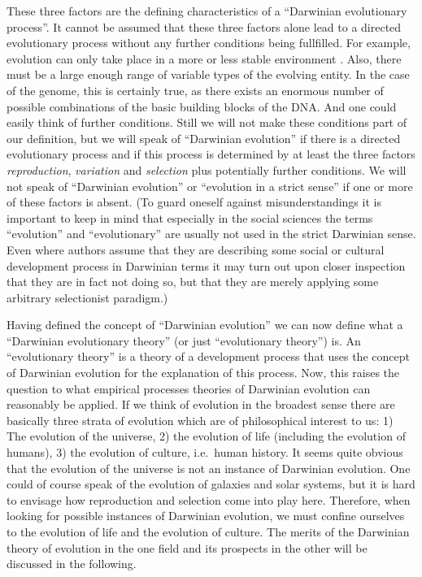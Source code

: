 These three factors are the defining characteristics of a ``Darwinian
evolutionary process''. It cannot be assumed that these three factors alone
lead to a directed evolutionary process without any further conditions being
fullfilled. For example, evolution can only take place in a more or less
stable environment \cite[p.\   336/336.]{schurz:2001}. Also, there must be a
large enough range of variable types of the evolving entity.  In the case of
the genome, this is certainly true, as there exists an enormous number of
possible combinations of the basic building blocks of the DNA. And one could
easily think of further conditions.  Still we will not make these conditions
part of our definition, but we will speak of ``Darwinian evolution'' if there
is a directed evolutionary process and if this process is determined by at
least the three factors {\em reproduction}, {\em variation} and {\em
  selection} plus potentially further conditions. We will not speak of
``Darwinian evolution'' or ``evolution in a strict sense'' if one or more of
these factors is absent. (To guard oneself against misunderstandings it is
important to keep in mind that especially in the social sciences the terms
``evolution'' and ``evolutionary'' are usually not used in the strict
Darwinian sense. Even where authors assume that they are describing some
social or cultural development process in Darwinian terms it may turn out upon
closer inspection that they are in fact not doing so, but that they are merely
applying some arbitrary selectionist paradigm.)

Having defined the concept of ``Darwinian evolution'' we can now define what a
``Darwinian evolutionary theory'' (or just ``evolutionary theory'') is.  An
``evolutionary theory'' is a theory of a development process that uses the
concept of Darwinian evolution for the explanation of this process. Now, this
raises the question to what empirical processes theories of Darwinian evolution can
reasonably be applied. If we think of evolution in the broadest sense there
are basically three strata of evolution which are of philosophical interest to
us: 1) The evolution of the universe, 2) the evolution of life (including the
evolution of humans), 3) the evolution of culture, i.e.\ human history. It
seems quite obvious that the evolution of the universe is not an instance of
Darwinian evolution. One could of course speak of the evolution of galaxies
and solar systems, but it is hard to envisage how reproduction and selection
come into play here. Therefore, when looking for possible instances of
Darwinian evolution, we must confine ourselves to the evolution of life and
the evolution of culture. The merits of the Darwinian theory of evolution in
the one field and its prospects in the other will be discussed in the
following.

